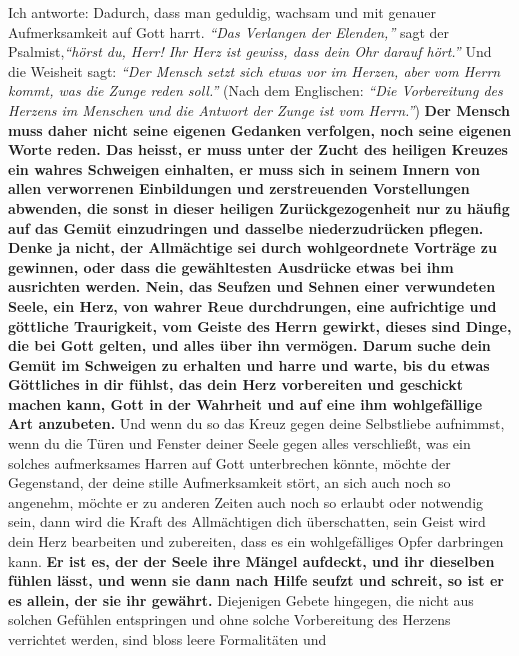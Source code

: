 Ich antworte: Dadurch, dass man geduldig,
wachsam und mit genauer Aufmerksamkeit
auf Gott harrt. 
\textit{"`Das Verlangen der Elenden,"'} sagt der Psalmist,\textit{"`hörst du,
Herr! Ihr Herz ist gewiss, dass dein Ohr darauf hört."'}
Und die Weisheit sagt:
\textit{"`Der Mensch setzt sich etwas vor im Herzen, aber vom
Herrn kommt, was die Zunge reden soll."'}
(Nach dem
Englischen:
\textit{"`Die Vorbereitung des Herzens im Menschen und die Antwort der Zunge
ist vom Herrn."'})
\label{ref:06_04_gebetshaltung} \textbf{Der Mensch muss
daher nicht seine eigenen Gedanken verfolgen,
noch seine eigenen Worte reden. Das heisst, er muss unter der Zucht des heiligen
Kreuzes ein wahres Schweigen einhalten, er muss sich in seinem Innern von allen
verworrenen Einbildungen und zerstreuenden Vorstellungen abwenden, die
sonst in dieser heiligen Zurückgezogenheit nur zu häufig auf das Gemüt
einzudringen und dasselbe niederzudrücken pflegen. Denke ja nicht, der
Allmächtige sei durch wohlgeordnete Vorträge zu gewinnen, oder dass die
gewähltesten Ausdrücke etwas bei ihm ausrichten werden. Nein, das Seufzen und
Sehnen einer verwundeten Seele, ein Herz, von wahrer Reue durchdrungen, eine
aufrichtige und göttliche Traurigkeit, vom Geiste des Herrn gewirkt, dieses sind
Dinge, die bei Gott gelten, und alles über ihn vermögen. Darum suche dein Gemüt
im Schweigen zu erhalten und harre und warte, bis du etwas Göttliches in dir
fühlst, das dein Herz vorbereiten und geschickt machen kann, Gott in der
Wahrheit und auf eine ihm wohlgefällige Art anzubeten.}
Und wenn du so das Kreuz
gegen deine Selbstliebe aufnimmst, wenn du die Türen und Fenster deiner Seele
gegen alles verschließt, was ein solches aufmerksames Harren auf Gott
unterbrechen könnte, möchte der Gegenstand, der deine stille Aufmerksamkeit
stört, an sich auch noch so angenehm, möchte er zu anderen Zeiten auch noch so
erlaubt oder notwendig sein, dann wird die Kraft des Allmächtigen dich
überschatten, sein Geist wird dein Herz bearbeiten und zubereiten, dass es ein
wohlgefälliges Opfer darbringen kann. \textbf{Er ist es, der der Seele ihre
Mängel
aufdeckt, und ihr dieselben fühlen lässt, und wenn sie dann nach Hilfe seufzt
und schreit, so ist er es allein, der sie ihr gewährt.}
Diejenigen Gebete
hingegen, die nicht aus solchen Gefühlen entspringen und ohne solche
Vorbereitung des Herzens verrichtet werden, sind bloss leere Formalitäten und
